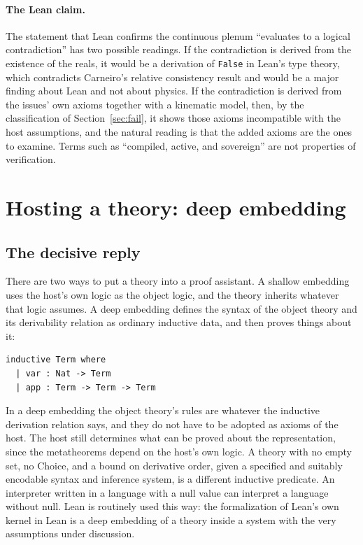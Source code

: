 \documentclass[11pt]{article}
\begin{document}
\paragraph{The Lean claim.} The statement that Lean confirms the continuous plenum ``evaluates to a logical contradiction'' has two possible readings. If the contradiction is derived from the existence of the reals, it would be a derivation of \texttt{False} in Lean's type theory, which contradicts Carneiro's relative consistency result and would be a major finding about Lean and not about physics. If the contradiction is derived from the issues' own axioms together with a kinematic model, then, by the classification of Section~\ref{sec:fail}, it shows those axioms incompatible with the host assumptions, and the natural reading is that the added axioms are the ones to examine. Terms such as ``compiled, active, and sovereign'' are not properties of verification.

\section{Hosting a theory: deep embedding}

\subsection{The decisive reply}

There are two ways to put a theory into a proof assistant. A shallow embedding uses the host's own logic as the object logic, and the theory inherits whatever that logic assumes. A deep embedding defines the syntax of the object theory and its derivability relation as ordinary inductive data, and then proves things about it:
\begin{lstlisting}
inductive Term where
  | var : Nat -> Term
  | app : Term -> Term -> Term
\end{lstlisting}
In a deep embedding the object theory's rules are whatever the inductive derivation relation says, and they do not have to be adopted as axioms of the host. The host still determines what can be proved about the representation, since the metatheorems depend on the host's own logic. A theory with no empty set, no Choice, and a bound on derivative order, given a specified and suitably encodable syntax and inference system, is a different inductive predicate. An interpreter written in a language with a null value can interpret a language without null. Lean is routinely used this way: the formalization of Lean's own kernel in Lean \cite{carneiro2024} is a deep embedding of a theory inside a system with the very assumptions under discussion.
\end{document}
